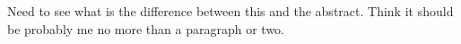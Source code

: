 
Need to see what is the difference between this and the abstract. Think it
should be probably me no more than a paragraph or two.
